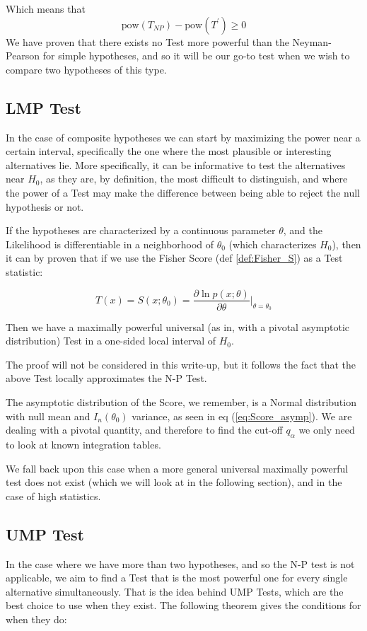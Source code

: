 Which means that
	\[
	\text{pow}\left(T_{NP}\right) - \text{pow}\left(T^\prime\right) \geq 0
	\]
We have proven that there exists no Test more powerful than the Neyman-Pearson for simple hypotheses, and so it will be our go-to test when we wish to compare two hypotheses of this type.

\subsection{LMP Test}
In the case of composite hypotheses we can start by maximizing the power near a certain interval, specifically the one where the most plausible or interesting alternatives lie. More specifically, it can be informative to test the alternatives near $H_0$, as they are, by definition, the most difficult to distinguish, and where the power of a Test may make the difference between being able to reject the null hypothesis or not. 

If the hypotheses are characterized by a continuous parameter $\theta$, and the Likelihood is differentiable in a neighborhood of $\theta_0$ (which characterizes $H_0$), then it can by proven that if we use the Fisher Score (def \ref{def:Fisher_S}) as a Test statistic:

	\[
	T(x) = S(x;\theta_0) = \frac{\partial \ln p(x;\theta)}{\partial \theta}\bigg\rvert_{\theta=\theta_0}
	\]

Then we have a maximally powerful universal (as in, with a pivotal asymptotic distribution) Test in a one-sided local interval of $H_0$.

The proof will not be considered in this write-up, but it follows the fact that the above Test locally approximates the N-P Test.

The asymptotic distribution of the Score, we remember, is a Normal distribution with null mean and $I_n(\theta_0)$ variance, as seen in eq (\ref{eq:Score_asymp}). We are dealing with a pivotal quantity, and therefore to find the cut-off $q_\alpha$ we only need to look at known integration tables.

We fall back upon this case when a more general universal maximally powerful test does not exist (which we will look at in the following section), and in the case of high statistics.

\subsection{UMP Test}
In the case where we have more than two hypotheses, and so the N-P test is not applicable, we aim to find a Test that is the most powerful one for every single alternative simultaneously. That is the idea behind UMP Tests, which are the best choice to use when they exist. The following theorem gives the conditions for when they do:

